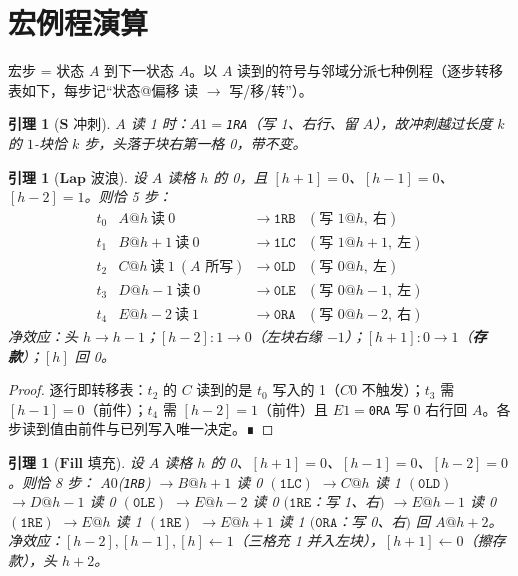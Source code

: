 \documentclass[11pt]{ctexart}
\newtheorem{lemma}[theorem]{引理}
\theoremstyle{definition}
\begin{document}
\section{宏例程演算}\label{sec:routines}

宏步 = 状态 $A$ 到下一状态 $A$。以 $A$ 读到的符号与邻域分派七种例程（逐步转移表如下，每步记``状态@偏移 读 $\to$ 写/移/转''）。

\begin{lemma}[$\mathbf{S}$ 冲刺]\label{lem:S}
$A$ 读 1 时：$A1=$\texttt{1RA}（写 1、右行、留 $A$），故冲刺越过长度 $k$ 的 $1$-块恰 $k$ 步，头落于块右第一格 0，带不变。
\end{lemma}

\begin{lemma}[$\mathbf{Lap}$ 波浪]\label{lem:Lap}
设 $A$ 读格 $h$ 的 0，且 $[h{+}1]=0$、$[h{-}1]=0$、$[h{-}2]=1$。则恰 5 步：
\[
\begin{array}{llll}
t_0 & A@h\ \text{读}\ 0 & \to\ \texttt{1RB} & (\text{写 }1@h,\ \text{右})\\
t_1 & B@h{+}1\ \text{读}\ 0 & \to\ \texttt{1LC} & (\text{写 }1@h{+}1,\ \text{左})\\
t_2 & C@h\ \text{读}\ 1\ (A\text{ 所写}) & \to\ \texttt{0LD} & (\text{写 }0@h,\ \text{左})\\
t_3 & D@h{-}1\ \text{读}\ 0 & \to\ \texttt{0LE} & (\text{写 }0@h{-}1,\ \text{左})\\
t_4 & E@h{-}2\ \text{读}\ 1 & \to\ \texttt{0RA} & (\text{写 }0@h{-}2,\ \text{右})
\end{array}
\]
净效应：头 $h\to h{-}1$；$[h{-}2]:1\to0$（左块右缘 $-1$）；$[h{+}1]:0\to1$（\textbf{存款}）；$[h]$ 回 0。
\end{lemma}
\begin{proof}
逐行即转移表：$t_2$ 的 $C$ 读到的是 $t_0$ 写入的 1（$C0$ 不触发）；$t_3$ 需 $[h{-}1]=0$（前件）；$t_4$ 需 $[h{-}2]=1$（前件）且 $E1=$\texttt{0RA} 写 0 右行回 $A$。各步读到值由前件与已列写入唯一决定。∎
\end{proof}

\begin{lemma}[$\mathbf{Fill}$ 填充]\label{lem:Fill}
设 $A$ 读格 $h$ 的 0、$[h{+}1]=0$、$[h{-}1]=0$、$[h{-}2]=0$。则恰 8 步：
$A0$(\texttt{1RB}) $\to B@h{+}1$ 读 0 $(\texttt{1LC})$ $\to C@h$ 读 1 $(\texttt{0LD})$ $\to D@h{-}1$ 读 0 $(\texttt{0LE})$ $\to E@h{-}2$ 读 0 $(\texttt{1RE}$：写 1、右$)$ $\to E@h{-}1$ 读 0 $(\texttt{1RE})$ $\to E@h$ 读 1 $(\texttt{1RE})$ $\to E@h{+}1$ 读 1 $(\texttt{0RA}$：写 0、右$)$ 回 $A@h{+}2$。
净效应：$[h{-}2],[h{-}1],[h]\gets1$（三格充 1 并入左块），$[h{+}1]\gets0$（擦存款），头 $h{+}2$。
\end{lemma}
\end{document}
